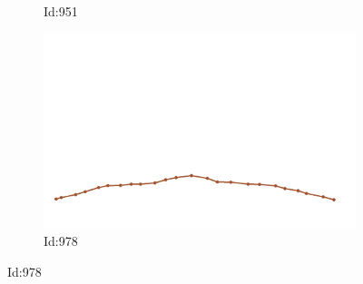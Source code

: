 \documentclass[12pt,twoside]{report}
\begin{document}
\begin{figure}
\begin{subfigure}[b]{0.20\textwidth}
\caption{Id:951}
\end{subfigure}
\begin{subfigure}[b]{0.20\textwidth}
\centering
\includegraphics[width=\textwidth]{../../trajectories/978.png}
\caption{Id:978}
\end{subfigure}
\end{figure}
\end{document}
